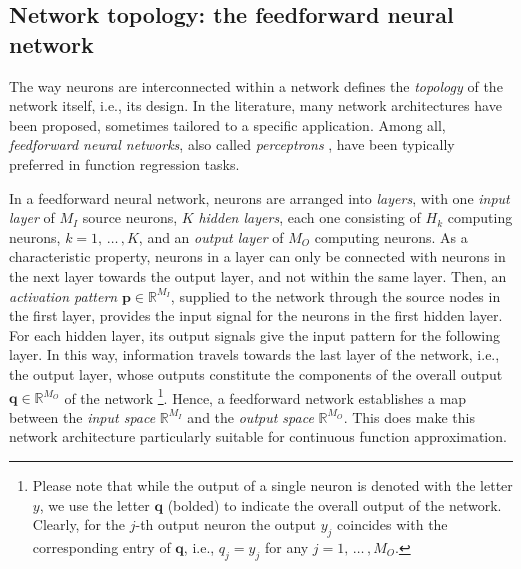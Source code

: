 \documentclass{elsarticle}
\numberwithin{equation}{section}
\theoremstyle{theorem}
\theoremstyle{definition}
\theoremstyle{remark}
\theoremstyle{proposition}
\numberwithin{figure}{section}
\begin{document}
		
	
	\subsection{Network topology: the feedforward neural network}
	\label{section:Network topology}
	
		The way neurons are interconnected within a network defines the \emph{topology} of the network itself, i.e., its design. In the literature, many network architectures have been proposed, sometimes tailored to a specific application. Among all, \emph{feedforward neural networks}, also called \emph{perceptrons} \cite{Ros58}, have been typically preferred in function regression tasks.
		
		In a feedforward neural network, neurons are arranged into \emph{layers}, with one \emph{input layer} of $M_I$ source neurons, $K$ \emph{hidden layers}, each one consisting of $H_k$ computing neurons, $k = 1, \, \ldots \, , K$, and an \emph{output layer} of $M_O$ computing neurons. As a characteristic property, neurons in a layer can only be connected with neurons in the next layer towards the output layer, and not within the same layer. Then, an \emph{activation pattern} $\mathbf{p} \in \mathbb{R}^{M_I}$, supplied to the network through the source nodes in the first layer, provides the input signal for the neurons in the first hidden layer. For each hidden layer, its output signals give the input pattern for the following layer. In this way, information travels towards the last layer of the network, i.e., the output layer, whose outputs constitute the components of the overall output $\mathbf{q} \in \mathbb{R}^{M_O}$ of the network \footnote{Please note that while the output of a single neuron is denoted with the letter $y$, we use the letter $\mathbf{q}$ (bolded) to indicate the overall output of the network. Clearly, for the $j$-th output neuron the output $y_j$ coincides with the corresponding entry of $\mathbf{q}$, i.e., $q_j = y_j$ for any $j = 1, \, \ldots \, , M_O$.}. Hence, a feedforward network establishes a map between the \emph{input space} $\mathbb{R}^{M_I}$ and the \emph{output space} $\mathbb{R}^{M_O}$. This does make this network architecture particularly suitable for continuous function approximation.
		
\end{document}
